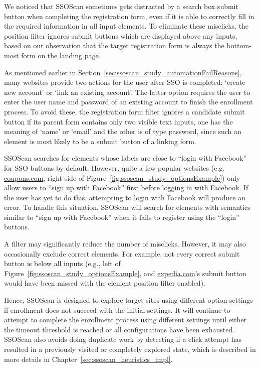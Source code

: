  We noticed that SSOScan sometimes gets distracted by a search box submit button when completing the registration form, even if it is able to correctly fill in the required information in all input elements.  To eliminate these misclicks, the position filter ignores submit buttons which are displayed above any inputs, based on our observation that the target registration form is always the bottom-most form on the landing page.

 As mentioned earlier in Section~\ref{sec:ssoscan_study_automationFailReasons}, many websites provide two actions for the user after SSO is completed: `create new account' or `link an existing account'.  The latter option requires the user to enter the user name and password of an existing account to finish the enrollment process.  To avoid these, the registration form filter ignores a candidate submit button if its parent form contains only two visible text inputs, one has the meaning of `name' or `email' and the other is of type password, since such an element is most likely to be a submit button of a linking form.

 SSOScan searches for elements whose labels are close to ``login with Facebook'' for SSO buttons by default.  However, quite a few popular websites (e.g. \url{coupons.com}, right side of Figure~\ref{fig:ssoscan_study_optionsExample}) only allow users to ``sign up with Facebook'' first before logging in with Facebook.  If the user has yet to do this, attempting to login with Facebook will produce an error.  To handle this situation, SSOScan will search for elements with semantics similar to ``sign up with Facebook'' when it fails to register using the ``login'' buttons.

A filter may significantly reduce the number of mis\-clicks.  However, it may also occasionally exclude correct elements.  For example, not every correct submit button is below all inputs (e.g., left of Figure~\ref{fig:ssoscan_study_optionsExample}, and \url{expedia.com}'s submit button would have been missed with the element position filter enabled).  

Hence, SSOScan is designed to explore target sites using different option settings if enrollment does not succeed with the initial settings.  It will continue to attempt to complete the enrollment process using different settings until either the timeout threshold is reached or all configurations have been exhausted.  SSOScan also avoids doing duplicate work by detecting if a click attempt has resulted in a previously visited or completely explored state, which is described in more details in Chapter~\ref{sec:ssoscan_heuristics_impl}.

